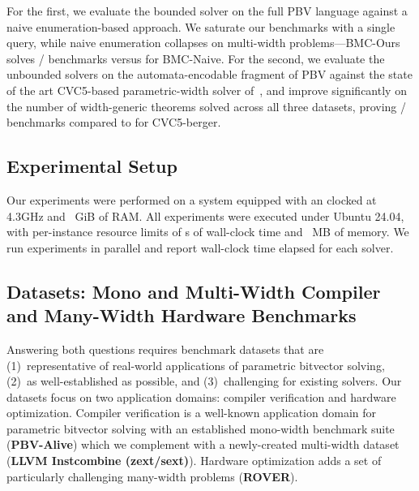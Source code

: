 For the first, we evaluate the bounded solver on the full PBV language against a
naive enumeration-based approach. We saturate our benchmarks with a single
\qfbv{} query, while naive enumeration collapses on multi-width
problems---BMC-Ours solves
\EverybenchNumSolvedMbmc{}/\EverybenchNumProblemsTotal{} benchmarks versus
\EverybenchNumSolvedNbmc{} for BMC-Naive. For the second, we evaluate the
unbounded solvers on the automata-encodable fragment of PBV against the state of
the art CVC5-based parametric-width solver
of~\citet{bit-precise-parametric-bv}, and improve significantly on the number of
width-generic theorems solved across all three datasets, proving
\EverybenchNumSolvedMr{}/\EverybenchNumProblemsTotal{} benchmarks compared to
\EverybenchNumSolvedC{} for CVC5-berger.


\subsection{Experimental Setup}
Our experiments were performed on a system equipped with an \MwSystemSpecsProcessorName{} clocked at 4.3GHz and \MwSystemSpecsMemoryGb{}~GiB of RAM.
All experiments were executed under Ubuntu 24.04, with per-instance resource limits of \MwConfigTimeoutSec{}s of wall-clock time and \MwConfigMemoutMb{}~MB of memory.
We run \MwConfigNproc{} experiments in parallel and report wall-clock time elapsed for each solver.

\subsection{Datasets: Mono and Multi-Width Compiler and Many-Width Hardware Benchmarks}
Answering both questions requires benchmark datasets that are
(1)~representative of real-world applications of parametric bitvector solving,
(2)~as well-established as possible,
and (3)~challenging for existing solvers. Our datasets focus on two application domains:
compiler verification and hardware optimization. Compiler verification is a
well-known application domain for parametric bitvector solving with an
established mono-width benchmark suite (\textbf{PBV-Alive}) which we complement
with a newly-created multi-width dataset (\textbf{LLVM Instcombine (zext/sext)}). Hardware
optimization adds a set of particularly challenging many-width problems (\textbf{ROVER}).

